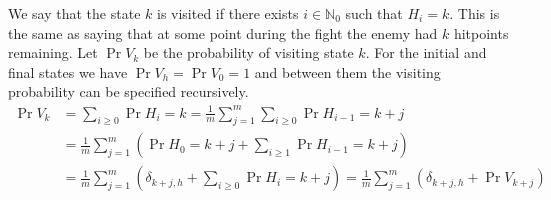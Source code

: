 We say that the state $k$ is visited if there exists $i \in \mathbb{N}_0$ such that $H_i = k$. This is the same as saying that at some point during the fight the enemy had $k$ hitpoints remaining. Let $\Pr{V_k}$ be the probability of visiting state $k$. For the initial and final states we have $\Pr{V_h} = \Pr{V_0} = 1$ and between them the visiting probability can be specified recursively.
\begin{align}
    \Pr{V_k} &= \sum_{i \geq 0} \Pr{H_i = k} = \frac{1}{m}\sum_{j=1}^m \sum_{i \geq 0} \Pr{H_{i-1} = k+j}\nonumber\\
            &= \frac{1}{m}\sum_{j=1}^m \left(\Pr{H_0 = k+j} + \sum_{i \geq 1} \Pr{H_{i-1} = k+j}\right)\nonumber\\
            &= \frac{1}{m}\sum_{j=1}^m \left(\delta_{k+j,h} + \sum_{i \geq 0} \Pr{H_{i} = k+j}\right)
            = \frac{1}{m}\sum_{j=1}^m \left(\delta_{k+j,h} + \Pr{V_{k+j}}\right)\label{eq:vkgen}
\end{align}

